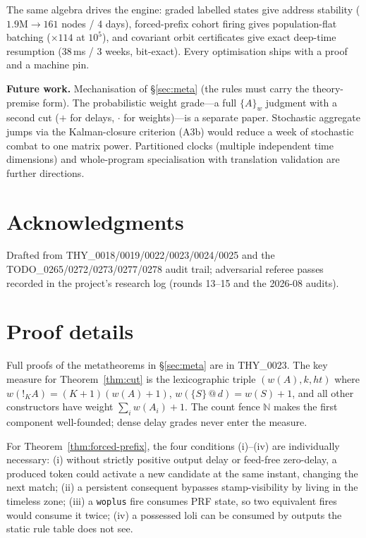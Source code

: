 \documentclass[11pt]{article}
\makeatletter
\newcommand{\lax}[2]{\{#1\}\mathbin{@}#2}       %
\newcommand{\gbang}[1]{{!}_{#1}}                 %
\newcommand{\NN}{\mathbb{N}}                     %
\theoremstyle{definition}
\theoremstyle{remark}
\makeatother
\begin{document}
The same algebra drives the engine: graded labelled states give address stability
($1.9\text{M} \to 161$ nodes / 4 days), forced-prefix cohort firing gives
population-flat batching ($\times 114$ at $10^5$), and covariant orbit
certificates give exact deep-time resumption (38\,ms / 3 weeks, bit-exact).  Every
optimisation ships with a proof and a machine pin.

\medskip
\noindent\textbf{Future work.}  Mechanisation of \S\ref{sec:meta} (the rules must
carry the theory-premise form).  The probabilistic weight grade---a full
$\{A\}_w$ judgment with a second cut ($+$ for delays, $\cdot$ for
weights)---is a separate paper.  Stochastic aggregate jumps via the Kalman-closure
criterion (A3b) would reduce a week of stochastic combat to one matrix power.
Partitioned clocks (multiple independent time dimensions) and whole-program
specialisation with translation validation are further directions.

\section*{Acknowledgments}

Drafted from THY\_0018/0019/0022/0023/0024/0025 and the
TODO\_0265/0272/0273/0277/0278 audit trail; adversarial referee passes recorded in
the project's research log (rounds 13--15 and the 2026-08 audits).




\appendix
\section{Proof details}
\label{app:proofs}

Full proofs of the metatheorems in \S\ref{sec:meta} are in THY\_0023.  The key
measure for Theorem~\ref{thm:cut} is the lexicographic triple
$(w(A), k, \mathit{ht})$ where $w(\gbang{K} A) = (K{+}1)(w(A){+}1)$,
$w(\lax{S}{d}) = w(S) + 1$, and all other constructors have weight $\sum_i
w(A_i) + 1$.  The count fence $\NN$ makes the first component well-founded; dense
delay grades never enter the measure.

For Theorem~\ref{thm:forced-prefix}, the four conditions (i)--(iv) are
individually necessary: (i) without strictly positive output delay or feed-free
zero-delay, a produced token could activate a new candidate at the same instant,
changing the next match; (ii) a persistent consequent bypasses stamp-visibility by
living in the timeless zone; (iii) a \texttt{woplus} fire consumes PRF state, so
two equivalent fires would consume it twice; (iv) a possessed loli can be consumed
by outputs the static rule table does not see.
\end{document}
